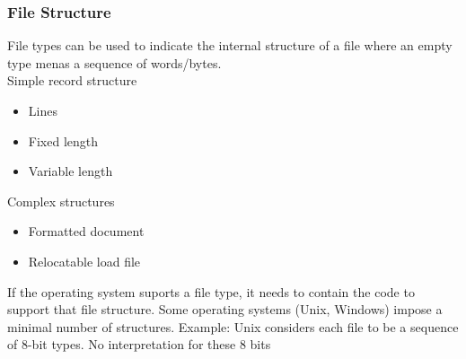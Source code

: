 \documentclass{book/custombook}
\begin{document}
                \subsubsection{File Structure}
                    File types can be used to indicate the internal structure of a file where an empty type
                    menas a sequence of words/bytes.\\
                    Simple record structure
                    \begin{itemize}
                        \item Lines
                        \item Fixed length
                        \item Variable length
                    \end{itemize}
                    Complex structures
                    \begin{itemize}
                        \item Formatted document
                        \item Relocatable load file
                    \end{itemize}
                    If the operating system suports a file type, it needs to contain the code to support that file structure.
                    Some operating systems (Unix, Windows) impose a minimal number of structures.
                    \subitem Example: Unix considers each file to be a sequence of 8-bit types. No interpretation for these 
                    8 bits
\end{document}
